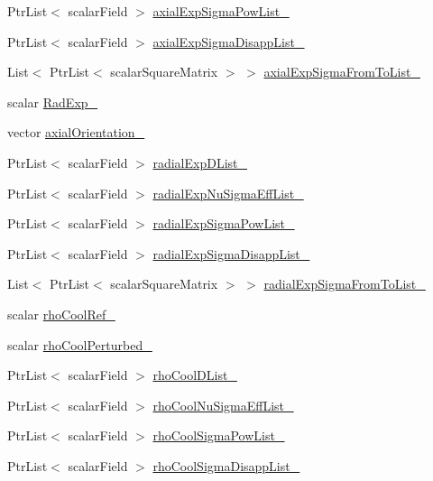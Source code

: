 \begin{DoxyCompactItemize}
\item 
Ptr\+List$<$ scalar\+Field $>$ \hyperlink{classFoam_1_1XS_ac374043dbb221475f4e06e36934756f5}{axial\+Exp\+Sigma\+Pow\+List\+\_\+}
\item 
Ptr\+List$<$ scalar\+Field $>$ \hyperlink{classFoam_1_1XS_afb3bfd4f175b31844a5d5a1f552bce74}{axial\+Exp\+Sigma\+Disapp\+List\+\_\+}
\item 
List$<$ Ptr\+List$<$ scalar\+Square\+Matrix $>$ $>$ \hyperlink{classFoam_1_1XS_a8a816b90c2317ba6735ad9071392d21e}{axial\+Exp\+Sigma\+From\+To\+List\+\_\+}
\item 
scalar \hyperlink{classFoam_1_1XS_a2c773fe264b61d1ee3f73136280c5b21}{Rad\+Exp\+\_\+}
\item 
vector \hyperlink{classFoam_1_1XS_a7a45b2d3cbea8c88b84341d51fa665c1}{axial\+Orientation\+\_\+}
\item 
Ptr\+List$<$ scalar\+Field $>$ \hyperlink{classFoam_1_1XS_a8ebf78b2210e6d7f66288988fc6c7050}{radial\+Exp\+D\+List\+\_\+}
\item 
Ptr\+List$<$ scalar\+Field $>$ \hyperlink{classFoam_1_1XS_aaeacc9ac4b30e1685c3c2115fa4fedd1}{radial\+Exp\+Nu\+Sigma\+Eff\+List\+\_\+}
\item 
Ptr\+List$<$ scalar\+Field $>$ \hyperlink{classFoam_1_1XS_a5926e12e988c7a3717247957b0ddff91}{radial\+Exp\+Sigma\+Pow\+List\+\_\+}
\item 
Ptr\+List$<$ scalar\+Field $>$ \hyperlink{classFoam_1_1XS_a4676a6a55f8e7aa4173442a6511038e8}{radial\+Exp\+Sigma\+Disapp\+List\+\_\+}
\item 
List$<$ Ptr\+List$<$ scalar\+Square\+Matrix $>$ $>$ \hyperlink{classFoam_1_1XS_a1fb3f1d9a8cdb19d7cfde4add417cbdd}{radial\+Exp\+Sigma\+From\+To\+List\+\_\+}
\item 
scalar \hyperlink{classFoam_1_1XS_af7db5962fe92b6af73ffe43f583a75ab}{rho\+Cool\+Ref\+\_\+}
\item 
scalar \hyperlink{classFoam_1_1XS_ac789326719f83e8384cc945cbb3c57f1}{rho\+Cool\+Perturbed\+\_\+}
\item 
Ptr\+List$<$ scalar\+Field $>$ \hyperlink{classFoam_1_1XS_ae8c0f1a7dfa0b2cd3c8cc86ddde632b8}{rho\+Cool\+D\+List\+\_\+}
\item 
Ptr\+List$<$ scalar\+Field $>$ \hyperlink{classFoam_1_1XS_ad4cce6811fcdd11ab6bcb477a5f170c7}{rho\+Cool\+Nu\+Sigma\+Eff\+List\+\_\+}
\item 
Ptr\+List$<$ scalar\+Field $>$ \hyperlink{classFoam_1_1XS_a5704f26b12e1c6fb981734d71e9d22e8}{rho\+Cool\+Sigma\+Pow\+List\+\_\+}
\item 
Ptr\+List$<$ scalar\+Field $>$ \hyperlink{classFoam_1_1XS_a77db4a4d3785dae9a8ce558e973f873c}{rho\+Cool\+Sigma\+Disapp\+List\+\_\+}

\end{DoxyCompactItemize}
